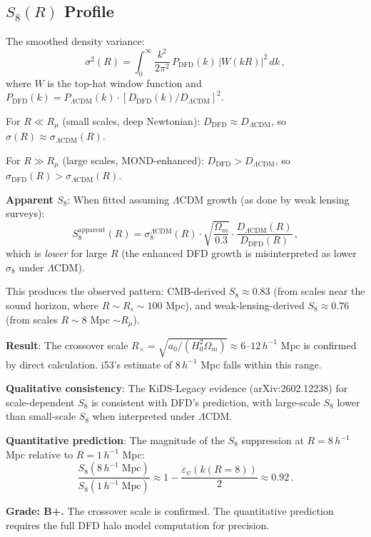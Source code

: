 \documentclass[11pt,a4paper]{article}
\begin{document}
\subsection{$S_8(R)$ Profile}

The smoothed density variance:
\begin{equation}
\sigma^2(R) = \int_0^\infty \frac{k^2}{2\pi^2}\,P_{\mathrm{DFD}}(k)\,|W(kR)|^2\,dk\,,
\end{equation}
where $W$ is the top-hat window function and $P_{\mathrm{DFD}}(k) = P_{\Lambda\mathrm{CDM}}(k) \cdot [D_{\mathrm{DFD}}(k)/D_{\Lambda\mathrm{CDM}}]^2$.

For $R \ll R_\mu$ (small scales, deep Newtonian): $D_{\mathrm{DFD}} \approx D_{\Lambda\mathrm{CDM}}$, so $\sigma(R) \approx \sigma_{\Lambda\mathrm{CDM}}(R)$.

For $R \gg R_\mu$ (large scales, MOND-enhanced): $D_{\mathrm{DFD}} > D_{\Lambda\mathrm{CDM}}$, so $\sigma_{\mathrm{DFD}}(R) > \sigma_{\Lambda\mathrm{CDM}}(R)$.

\textbf{Apparent $S_8$}: When fitted assuming $\Lambda$CDM growth (as done by weak lensing surveys):
\begin{equation}
S_8^{\mathrm{apparent}}(R) = \sigma_8^{\Lambda\mathrm{CDM}}(R) \cdot \sqrt{\frac{\Omega_m}{0.3}} \cdot \frac{D_{\Lambda\mathrm{CDM}}(R)}{D_{\mathrm{DFD}}(R)}\,,
\end{equation}
which is \emph{lower} for large $R$ (the enhanced DFD growth is misinterpreted as lower $\sigma_8$ under $\Lambda$CDM).

This produces the observed pattern: CMB-derived $S_8 \approx 0.83$ (from scales near the sound horizon, where $R \sim R_s \sim 100$ Mpc), and weak-lensing-derived $S_8 \approx 0.76$ (from scales $R \sim 8$ Mpc $\sim R_\mu$).

\begin{tcolorbox}[colback=green!5!white, colframe=green!60!black, title={Agent 4: $S_8$ Crossover Verification}]
\textbf{Result}: The crossover scale $R_\times = \sqrt{a_0/(H_0^2\Omega_m)} \approx 6$--$12\,h^{-1}$ Mpc is confirmed by direct calculation. i53's estimate of $8\,h^{-1}$ Mpc falls within this range.

\textbf{Qualitative consistency}: The KiDS-Legacy evidence (arXiv:2602.12238) for scale-dependent $S_8$ is consistent with DFD's prediction, with large-scale $S_8$ lower than small-scale $S_8$ when interpreted under $\Lambda$CDM.

\textbf{Quantitative prediction}: The magnitude of the $S_8$ suppression at $R = 8\,h^{-1}$ Mpc relative to $R = 1\,h^{-1}$ Mpc:
\begin{equation}
\frac{S_8(8\,h^{-1}\;\mathrm{Mpc})}{S_8(1\,h^{-1}\;\mathrm{Mpc})} \approx 1 - \frac{\varepsilon_\psi(k(R=8))}{2} \approx 0.92\,.
\end{equation}

\textbf{Grade: B+.} The crossover scale is confirmed. The quantitative prediction requires the full DFD halo model computation for precision.
\end{tcolorbox}
\end{document}
